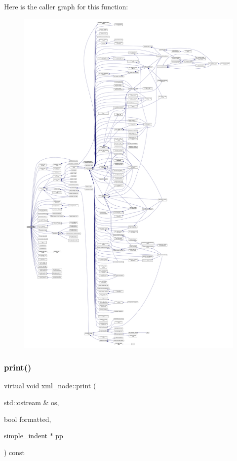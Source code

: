 Here is the caller graph for this function\+:
\nopagebreak
\begin{figure}[H]
\begin{center}
\leavevmode
\includegraphics[width=350pt]{d1/dc3/classxml__node_a3ed9ef0b9fa4767ef02a1be8e01217b3_icgraph}
\end{center}
\end{figure}
\mbox{\label{classxml__node_a150e224e18301e5842d10a5e47cc2661}} 
\subsubsection{\texorpdfstring{print()}{print()}}
{\footnotesize\ttfamily virtual void xml\+\_\+node\+::print (\begin{DoxyParamCaption}\item[{std\+::ostream \&}]{os,  }\item[{bool}]{formatted,  }\item[{\hyperlink{classsimple__indent}{simple\+\_\+indent} $\ast$}]{pp }\end{DoxyParamCaption}) const\hspace{0.3cm}{\ttfamily [pure virtual]}}




